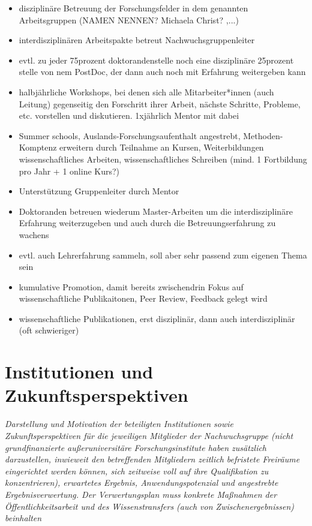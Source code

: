 \documentclass[a4paper,11pt,twoside]{scrartcl}
\begin{document}
\begin{itemize}
 \item disziplinäre Betreuung der Forschungsfelder in dem genannten Arbeitsgruppen (NAMEN NENNEN? Michaela Christ? ,...)
 \item interdisziplinären Arbeitspakte betreut Nachwuchsgruppenleiter
 \item evtl. zu jeder 75prozent doktorandenstelle noch eine disziplinäre 25prozent stelle von nem PostDoc, der dann auch noch mit Erfahrung weitergeben kann
 \item halbjährliche Workshops, bei denen sich alle Mitarbeiter*innen (auch Leitung) gegenseitig den Forschritt ihrer Arbeit, nächste Schritte, Probleme, etc. vorstellen und diskutieren. 1xjährlich Mentor mit dabei
 \item Summer schools, Auslands-Forschungsaufenthalt angestrebt, Methoden-Komptenz erweitern durch Teilnahme an Kursen, Weiterbildungen wissenschaftliches Arbeiten, wissenschaftliches Schreiben (mind. 1 Fortbildung pro Jahr + 1 online Kurs?)
 \item Unterstützung Gruppenleiter durch Mentor
 \item Doktoranden betreuen wiederum Master-Arbeiten um die interdisziplinäre Erfahrung weiterzugeben und auch durch die Betreuungserfahrung zu wachens
 \item evtl. auch Lehrerfahrung sammeln, soll aber sehr passend zum eigenen Thema sein
 \item kumulative Promotion, damit bereits zwischendrin Fokus auf wissenschaftliche Publikaitonen, Peer Review, Feedback gelegt wird
 \item wissenschaftliche Publikationen, erst disziplinär, dann auch interdisziplinär (oft schwieriger)
\end{itemize}

\section{Institutionen und Zukunftsperspektiven}
\textit{Darstellung und Motivation der beteiligten Institutionen sowie Zukunftsperspektiven für die jeweiligen Mitglieder der Nachwuchsgruppe (nicht grundfinanzierte außeruniversitäre Forschungsinstitute haben zusätzlich darzustellen, inwieweit den betreffenden Mitgliedern zeitlich befristete Freiräume eingerichtet werden können, sich zeitweise voll auf ihre Qualifikation zu konzentrieren), erwartetes Ergebnis, Anwendungspotenzial und angestrebte Ergebnisverwertung. Der Verwertungsplan muss konkrete Maßnahmen der Öffentlichkeitsarbeit und des Wissenstransfers (auch von Zwischenergebnissen) beinhalten}
\end{document}

